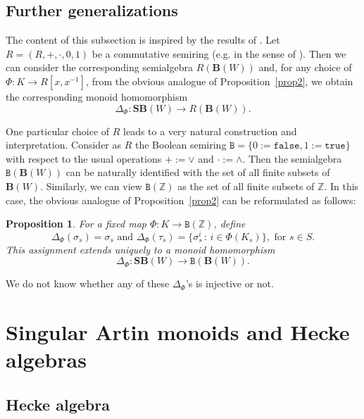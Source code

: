 \documentclass[a4paper]{amsart}
\newtheorem{proposition}[theorem]{Proposition}
\begin{document}
\subsection{Further generalizations}\label{s3.5}

The content of this subsection is inspired by 
the results of \cite[Subsection~2.2]{MaSt}.
Let $R=(R,+,\cdot,0,1)$ be a commutative semiring (e.g. in the sense of 
\cite[Subsection~2.1]{CDJMPZZ}). Then we can consider 
the corresponding semialgebra $R(\mathbf{B}(W))$ and, for any
choice of $\Phi:K\to R[x,x^{-1}]$, from the obvious analogue of
Proposition~\ref{prop2}, we obtain the corresponding 
monoid homomorphism $$\Delta_\Phi:\mathbf{SB}(W)\to R(\mathbf{B}(W)).$$

One particular choice of $R$ leads to a very natural construction
and interpretation. Consider as $R$ the Boolean semiring
$\mathtt{B}=\{0:=\mathtt{false},1:=\mathtt{true}\}$ with respect
to the usual operations $+:=\vee$ and $\cdot:=\wedge$.
Then the semialgebra $\mathtt{B}(\mathbf{B}(W))$ can be naturally 
identified with the set of all finite subsets of $\mathbf{B}(W)$.
Similarly, we can view $\mathtt{B}(\mathbb{Z})$
as the set of all finite subsets of $\mathbb{Z}$.
In this case, the obvious analogue of Proposition~\ref{prop2}
can be reformulated as follows:

\begin{proposition}\label{prop4} 
For a fixed map $\Phi:K\to \mathtt{B}(\mathbb{Z})$, define
\begin{displaymath}
\Delta_\Phi(\sigma_s)=\sigma_s\text{ and }
\Delta_\Phi(\tau_s)=\{\sigma_s^i\,:\,i\in \Phi(K_s)\},\text{ for }s\in S.
\end{displaymath}
This assignment extends uniquely to a monoid homomorphism
\begin{displaymath}
\Delta_\Phi:\mathbf{SB}(W)\to \mathtt{B}(\mathbf{B}(W)). 
\end{displaymath}
\end{proposition}

We do not know whether any of these $\Delta_\Phi$'s is injective or not.

\section{Singular Artin monoids and Hecke algebras}\label{s9}

\subsection{Hecke algebra}\label{s9.1}
\end{document}
